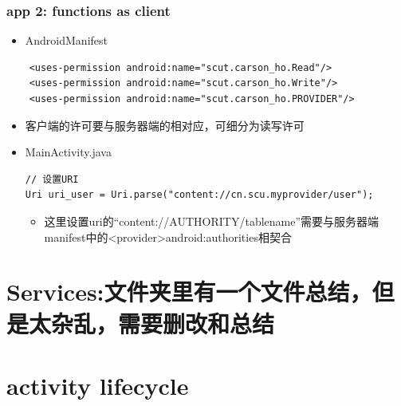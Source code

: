 \documentclass[9pt, b5paaper]{book}
\begin{document}
\subsection{app 2: functions as client}
\label{sec-5-9-2}
\begin{itemize}
\item AndroidManifest
\end{itemize}
\begin{verbatim}
    <uses-permission android:name="scut.carson_ho.Read"/>
    <uses-permission android:name="scut.carson_ho.Write"/>
    <uses-permission android:name="scut.carson_ho.PROVIDER"/>
\end{verbatim}
\begin{itemize}
\item 客户端的许可要与服务器端的相对应，可细分为读写许可
\item MainActivity.java
\begin{verbatim}
// 设置URI
Uri uri_user = Uri.parse("content://cn.scu.myprovider/user");
\end{verbatim}
\begin{itemize}
\item 这里设置uri的“content://AUTHORITY/tablename”需要与服务器端manifest中的<provider>android:authorities相契合
\end{itemize}
\end{itemize}

\chapter{Services:文件夹里有一个文件总结，但是太杂乱，需要删改和总结}
\label{sec-6}

\chapter{activity lifecycle}
\label{sec-7}
\end{document}
